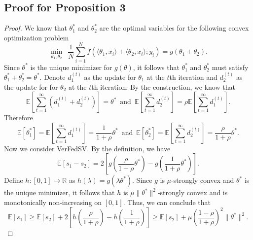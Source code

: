 \subsection{Proof for Proposition 3}
\begin{proof}
    We know that $\theta_1^*$ and $\theta_2^*$ are the optimal variables for the following convex optimization problem 
    \[\min_{\theta_1, \theta_2}\enspace \frac{1}{N}\sum_{i=1}^N f(\langle\theta_1, x_i\rangle + \langle\theta_2, x_i\rangle; y_i) = g(\theta_1 + \theta_2).\]
    Since $\theta^*$ is the unique minimizer for $g(\theta)$, it follows that $\theta_1^*$ and $\theta_2^*$ must satisfy $\theta_1^* + \theta_2^* = \theta^*$. Denote $d_1^{(t)}$ as the update for $\theta_1$ at the $t$th iteration and $d_2^{(t)}$ as the update for for $\theta_2$ at the $t$th iteration. By the construction, we know that 
    \[\mathbb{E} \left[ \sum_{t=1}^\infty ( d_1^{(t)} + d_2^{(t)} ) \right] = \theta^* \enspace\text{and}\enspace \mathbb{E}\left[ \sum_{t=1}^\infty d_2^{(t)} \right] = \rho \mathbb{E}\left[ \sum_{t=1}^\infty d_1^{(t)} \right].\]
    Therefore
    \[
        \mathbb{E}[\theta_1^*] = \mathbb{E}\left[ \sum_{t=1}^\infty d_1^{(t)} \right] = \frac{1}{1+\rho} \theta^* \enspace\text{and}\enspace \mathbb{E}[\theta_2^*] = \mathbb{E}\left[ \sum_{t=1}^\infty d_2^{(t)} \right] = \frac{\rho}{1+\rho} \theta^*.
    \]
    Now we consider VerFedSV. By the definition, we have 
    \[\mathbb{E}[s_1 - s_2] = 2\left[g\left(\frac{\rho}{1+\rho}\theta^*\right) - g\left(\frac{1}{1+\rho}\theta^*\right)\right].\]
    Define $h:[0,1]\to\mathbb{R}$ as $h(\lambda) = g(\lambda \theta^*)$. Since $g$ is $\mu$-strongly convex and $\theta^*$ is the unique minimizer, it follows that $h$ is $\mu\|\theta^*\|^2$-strongly convex and is monotonically non-increasing on $[0,1]$. Thus, we can conclude that 
    \[\mathbb{E}[s_1] \geq \mathbb{E}[s_2] + 2\left[h\left(\frac{\rho}{1+\rho}\right) - h\left(\frac{1}{1+\rho}\right)\right] \geq \mathbb{E}[s_2] + \mu\left(\frac{1-\rho}{1+\rho}\right)^2\|\theta^*\|^2.\]
\end{proof}